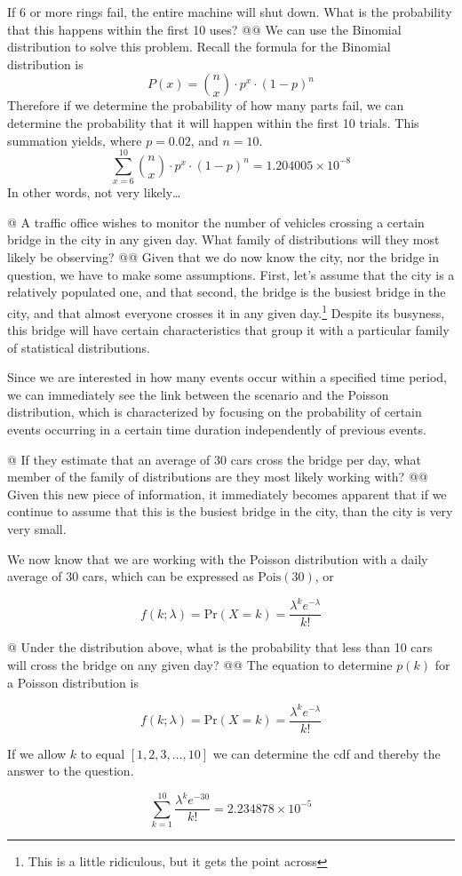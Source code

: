 \documentclass[10pt]{article}
\begin{document}
\begin{easylist}[enumerate]
    If 6 or more rings fail, the entire machine will shut down. What is the probability that this happens within the
    first 10 uses?
    @@ We can use the Binomial distribution to solve this problem. Recall the formula for the Binomial distribution is
        \[ P(x) = \binom{n}{x} \cdot p^x \cdot {(1 - p)}^n \]
        Therefore if we determine the probability of how many parts fail, we can determine the probability that it will
        happen within the first 10 trials. This summation yields, where $p=0.02$, and $n=10$.
        \[ \sum^{10}_{x=6} \binom{n}{x} \cdot p^x \cdot {(1 - p)}^n = \boxed{1.204005 \times 10^{-8} } \]
        In other words, not very likely\ldots

    @ A traffic office wishes to monitor the number of vehicles crossing a certain bridge in the city in any given day.
    What family of distributions will they most likely be observing?
    @@ Given that we do now know the city, nor the bridge in question, we have to make some assumptions. First, let's
    assume that the city is a relatively populated one, and that second, the bridge is the busiest bridge in the city,
    and that almost everyone crosses it in any given day.\footnote{This is a little ridiculous, but it gets the point
    across} Despite its busyness, this bridge will have certain characteristics that group it with a particular family
    of statistical distributions.\newline

    Since we are interested in how many events occur within a specified time period, we can immediately see the link
    between the scenario and the Poisson distribution, which is characterized by focusing on the probability of certain
    events occurring in a certain time duration independently of previous events.

    @ If they estimate that an average of 30 cars cross the bridge per day, what member of the family of distributions
    are they most likely working with?
    @@ Given this new piece of information, it immediately becomes apparent that if we continue to assume that this is
    the busiest bridge in the city, than the city is very very small.\newline

    We now know that we are working with the Poisson distribution with a daily average of 30 cars, which can be
    expressed as $\mathrm{Pois}(30)$, or

        \[ f(k;\lambda) = \mathrm{Pr}(X=k) = \frac{\lambda^k e^{-\lambda} }{k!} \]

    @ Under the distribution above, what is the probability that less than 10 cars will cross the bridge on any given
    day?
    @@ The equation to determine $p(k)$ for a Poisson distribution is

        \[ f(k;\lambda) = \mathrm{Pr}(X=k) = \frac{\lambda^k e^{-\lambda} }{k!} \]

        If we allow $k$ to equal $[1, 2, 3, \ldots, 10]$ we can determine the cdf and thereby the answer to the
        question.

        \[ \sum^{10}_{k=1} \frac{\lambda^k e^{-30} }{k!} = \boxed{2.234878 \times 10^{-5} } \]
\end{easylist}
\end{document}
